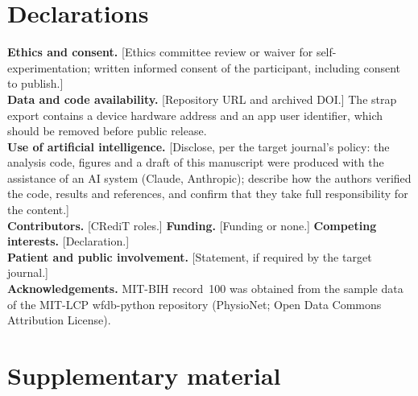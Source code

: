 \documentclass[11pt,a4paper]{article}
\newcommand{\todo}[1]{\textcolor{todo}{\textsf{[#1]}}}
\begin{document}
\section*{Declarations}
\small
\textbf{Ethics and consent.} \todo{Ethics committee review or waiver for self-experimentation; written informed consent of the participant, including consent to publish.}\\
\textbf{Data and code availability.} \todo{Repository URL and archived DOI.} The strap export contains a device hardware address and an app user identifier, which should be removed before public release.\\
\textbf{Use of artificial intelligence.} \todo{Disclose, per the target journal's policy: the analysis code, figures and a draft of this manuscript were produced with the assistance of an AI system (Claude, Anthropic); describe how the authors verified the code, results and references, and confirm that they take full responsibility for the content.}\\
\textbf{Contributors.} \todo{CRediT roles.}\quad
\textbf{Funding.} \todo{Funding or none.}\quad
\textbf{Competing interests.} \todo{Declaration.}\\
\textbf{Patient and public involvement.} \todo{Statement, if required by the target journal.}\\
\textbf{Acknowledgements.} MIT-BIH record~100 was obtained from the sample data of the MIT-LCP wfdb-python repository (PhysioNet; Open Data Commons Attribution License).
\normalsize

\nolinenumbers
\printbibliography[heading=bibintoc,title={References}]

\clearpage
\appendix
\renewcommand{\thetable}{S\arabic{table}}
\renewcommand{\thefigure}{S\arabic{figure}}
\setcounter{table}{0}
\setcounter{figure}{0}
\section*{Supplementary material}

\begin{table}[H]
\centering\small
\caption{Median absolute error (\%) of 5-min RMSSD on exactly the windows retained by the proposed method (default gate), with empirical strap noise. The last row of each panel gives the number of windows compared.}

\end{table}

\begin{table}[H]
\centering\small
\caption{Pitfall decomposition for the illustrative night (values in Figure~\ref{fig:pitfalls}). Rows without coverage matching compare the watch's reported nightly mean (\watchReported{}~ms) with the strap's whole-night mean; coverage-matched rows compare the mean of the matched watch readings with the mean of the matched strap windows (Supplementary Table~S3). Differences were computed before rounding.}

\end{table}
\end{document}
